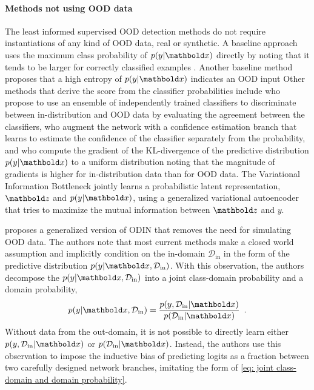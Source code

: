 \paragraph{Methods not using OOD data}
The least informed supervised OOD detection methods do not require instantiations of any kind of OOD data, real or synthetic. 
A baseline approach uses the maximum class probability of $p(y|\xb)$ directly by noting that it tends to be larger for correctly classified examples \parencite{hendrycks_baseline_2017}. Another baseline method proposes that a high entropy of $p(y|\xb)$ indicates an OOD input \parencite{ren_likelihood_2019} 
Other methods that derive the score from the classifier probabilities include \textcite{lakshminarayanan_simple_2017} who propose to use an ensemble of independently trained classifiers to discriminate between in-distribution and OOD data by evaluating the agreement between the classifiers, \textcite{devries_learning_2018} who augment the network with a confidence estimation branch that learns to estimate the confidence of the classifier separately from the probability, and \textcite{huang_importance_2021} who compute the gradient of the KL-divergence of the predictive distribution $p(y|\xb)$ to a uniform distribution noting that the magnitude of gradients is higher for in-distribution data than for OOD data. 
The Variational Information Bottleneck \parencite{alemi_deep_2017} jointly learns a probabilistic latent representation, $\zb$ and $p(y|\xb)$, using a generalized variational autoencoder \parencite{kingma_autoencoding_2014} that tries to maximize the mutual information between $\zb$ and $y$.

\textcite{hsu_generalized_2020} proposes a generalized version of ODIN that removes the need for simulating OOD data.
The authors note that most current methods make a closed world assumption and implicitly condition on the in-domain $\mathcal{D}_{\text{in}}$ in the form of the predictive distribution $p(y|\xb, \mathcal{D}_{\text{in}})$. With this observation, the authors decompose the $p(y|\xb, \mathcal{D}_{\text{in}})$ into a joint class-domain probability and a domain probability,
%
\begin{equation} \label{eq: joint class-domain and domain probability}
    p(y|\xb,\mathcal{D}_{\text{in}}) = \frac{p(y, \mathcal{D}_{\text{in}}|\xb)}{p(\mathcal{D}_{\text{in}}|\xb)} \enspace .
\end{equation}
%
Without data from the out-domain, it is not possible to directly learn either $p(y, \mathcal{D}_{\text{in}}|\xb)$ or $p(\mathcal{D}_{\text{in}}|\xb)$. Instead, the authors use this observation to impose the inductive bias of predicting logits as a fraction between two carefully designed network branches, imitating the form of \cref{eq: joint class-domain and domain probability}. 

